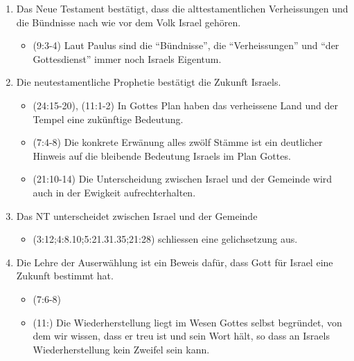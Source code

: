 \documentclass{../../inc/mybib}
\begin{document}
\begin{enumerate}
\begin{itemize}
    \end{itemize}
    \item Das Neue Testament bestätigt, dass die alttestamentlichen Verheissungen und die Bündnisse nach wie vor dem Volk Israel gehören.
    \begin{itemize}
        \item {}(9:3-4) Laut Paulus sind die \enquote{Bündnisse}, die \enquote{Verheissungen} und \enquote{der Gottesdienst} immer noch Israels Eigentum.
    \end{itemize}
    \item Die neutestamentliche Prophetie bestätigt die Zukunft Israels.
    \begin{itemize}
        \item {}(24:15-20), (11:1-2) In Gottes Plan haben das verheissene Land und der Tempel eine zukünftige Bedeutung.
        \item {}(7:4-8) Die konkrete Erwänung alles zwölf Stämme ist ein deutlicher Hinweis auf die bleibende Bedeutung Israels im Plan Gottes.
        \item {}(21:10-14) Die Unterscheidung zwischen Israel und der Gemeinde wird auch in der Ewigkeit aufrechterhalten.
    \end{itemize}
    \item Das NT unterscheidet zwischen Israel und der Gemeinde
    \begin{itemize}
        \item {}(3:12;4:8.10;5:21.31.35;21:28) schliessen eine gelichsetzung aus.
    \end{itemize}
    \item Die Lehre der Auserwählung ist ein Beweis dafür, dass Gott für Israel eine Zukunft bestimmt hat.
    \begin{itemize}
        \item {}(7:6-8)
        \item {}(11:) Die Wiederherstellung liegt im Wesen Gottes selbst begründet, von dem wir wissen, dass er treu ist und sein Wort hält, so dass an Israels Wiederherstellung kein Zweifel sein kann.
    \end{itemize}    
\end{enumerate}
\end{document}
